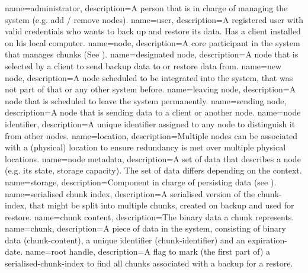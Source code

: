 {
    name={administrator},
    description={A person that is in charge of managing the system (e.g. add / remove nodes).}
}
{
    name={user},
    description={A registered user with valid credentials who wants to back up and restore its data. Has a client installed on his local computer.}
}
{
    name={node},
    description={A core participant in the system that manages \glspl{chunk} (See ).}
}
{
    name={designated node},
    description={A \gls{node} that is selected by a \gls{client} to send backup data to or restore data from.}
}
{
    name={new node},
    description={A \gls{node} scheduled to be integrated into the system, that was not part of that or any other system before.}
}
{
    name={leaving node},
    description={A \gls{node} that is scheduled to leave the system permanently.}
}
{
    name={sending node},
    description={A \gls{node} that is sending data to a client or another node.}
}
{
    name={node identifier},
    description={A unique identifier assigned to any node to distinguish it from other \glspl{node}.}
}
{
    name={location},
    description={Multiple \glspl{node} can be associated with a (physical) location to ensure redundancy is met over multiple physical locations.}
}
{
    name={node metadata},
    description={A set of data that describes a \gls{node} (e.g. its state, storage capacity). The set of data differs depending on the context.}
}
{
    name={storage},
    description={Component in charge of persisting data (see ).}
}
{
    name={serialised chunk index},
    description={A serialised version of the \gls{chunk-index}, that might be split into multiple chunks, created on backup and used for restore.}
}
{
    name={chunk content},
    description={The binary data a chunk represents.}
}
{
    name={chunk},
    description={A piece of data in the system, consisting of binary data (\gls{chunk-content}), a unique identifier (\gls{chunk-identifier}) and an \gls{expiration-date}.}
}
{
    name={root handle},
    description={A flag to mark (the first part of) a \gls{serialised-chunk-index} to find all chunks associated with a backup for a restore.}
}

